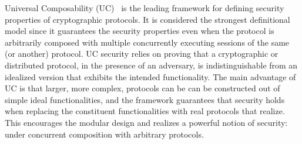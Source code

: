 Universal Composability (UC)~\cite{canettiUC} is the leading framework for defining security properties of cryptographic protocols.
It is considered the strongest definitional model since it guarantees the security properties even when the protocol is arbitrarily composed with
multiple concurrently executing sessions of the same (or another) protocol.
UC security relies on proving that a cryptographic or distributed protocol, in the presence of an adversary, is indistinguishable from an idealized version that exhibits the intended functionality.
The main advantage of UC is that larger, more complex, protocols can be can be constructed out of simple ideal functionalities, and the framework guarantees that security holds when 
replacing the constituent functionalities with real protocols that realize.
This encourages the modular design and realizes a powerful notion of security: under concurrent composition with arbitrary protocols.



